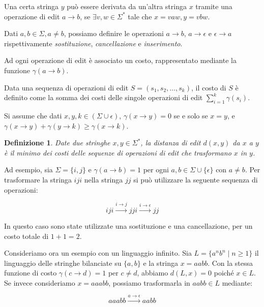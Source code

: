 \documentclass[a4paper,12pt]{report}
\newtheorem{definition}{Definizione}[chapter]
\theoremstyle{propositionstyle}
\begin{document}
    Una certa stringa $y$ può essere derivata da un'altra stringa $x$ tramite una operazione di edit $a \rightarrow b$, se $\exists v, w \in \Sigma^*$ tale che $x = vaw, y = vbw$.

    Dati $a, b \in \Sigma, a \neq b$, possiamo definire le operazioni $a \rightarrow b$, $a \rightarrow \epsilon$ e $\epsilon \rightarrow a$ rispettivamente
    \textit{sostituzione}, \textit{cancellazione} e \textit{inserimento}.

    Ad ogni operazione di edit è associato un costo, rappresentato mediante la funzione $\gamma(a \rightarrow b)$.

    Data una sequenza di operazioni di edit $S = \left(s_1, s_2, \dots, s_k\right)$, il costo di $S$ è definito come la somma dei costi delle singole operazioni di edit
    $\sum_{i=1}^{k} \gamma(s_i)$.

    Si assume che dati $x, y, k \in \left(\Sigma \cup \epsilon\right)$, $\gamma\left(x \rightarrow y\right) = 0$ se e solo se $x = y$, e $\gamma\left(x \rightarrow y\right)
    + \gamma\left(y \rightarrow k\right) \geq \gamma\left(x \rightarrow k\right)$.

    \begin{definition}
        Date due stringhe $x, y \in \Sigma^*$, la distanza di edit $d\left(x, y\right)$ da $x$ a $y$ è il minimo dei costi delle sequenze di operazioni di edit che trasformano $x$ in $y$.
    \end{definition}

    Ad esempio, sia $\Sigma = \{i, j\}$ e $\gamma\left(a \rightarrow b\right) = 1$ per ogni $a, b \in \Sigma \cup \{\epsilon\}$ con $a \neq b$. Per trasformare la stringa $iji$ nella stringa $jj$ si può utilizzare la seguente sequenza di operazioni:

    \[
        iji \xrightarrow{i \rightarrow j} jji \xrightarrow{i \rightarrow \epsilon} jj
    \]

    In questo caso sono state utilizzate una sostituzione e una cancellazione, per un costo totale di $1 + 1 = 2$.

    Consideriamo ora un esempio con un linguaggio infinito. Sia $L = \{a^n b^n \mid n \geq 1\}$ il linguaggio delle stringhe bilanciate su $\{a, b\}$ e la stringa $x = aabb$. Con la stessa funzione di costo $\gamma(c \rightarrow d) = 1$ per $c \neq d$, abbiamo $d(L, x) = 0$ poiché $x \in L$. Se invece consideriamo $x = aaabb$, possiamo trasformarla in $aabb \in L$ mediante:

    \[
        aaabb \xrightarrow{a \rightarrow \epsilon} aabb
    \]
\end{document}
